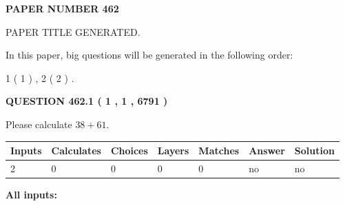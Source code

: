 \documentclass[12pt]{article}
\begin{document}
   
   
   
\newpage 
\setcounter{page}{ 
   462001 } 
   
   
   
   
 {\textbf{ \Large{ PAPER NUMBER  462  }}}
   
   
\vspace{0.2in}
   
   
   
   
   
   
   
   
 \vspace{0.2in}
 
 
 
 
   
   
 PAPER TITLE GENERATED.
   
   
   
\vspace{0.2in}
   
In this paper, big questions will be generated in the following order: 
   
   
   1 ( 1 )
 ,
   2 ( 2 )
 .
  
\vspace{0.2in}
  
{\textbf{\Large{QUESTION
462.1 
 ( 1 , 1 , 6791 )
}}}
  
  
 
Please calculate $ %
38 +  %
61 $.
 
 
   
   
   
   
\noindent\begin{tabular}{|l|l|l|l|l|l|l|}
 \hline
Inputs & Calculates & Choices & Layers & Matches & Answer & Solution \\ \hline
 2  & 
 0  & 
 0
  & 
 0  & 
 0  & 
  no & 
  no 
  \\ \hline
 \end{tabular}
   
   
   
   
\noindent{}
   
   
   
   
\noindent\vspace{0.1in}\hspace{-0.08in} {\textbf{\Large{All inputs: }}}
   
   
  
\end{document}
